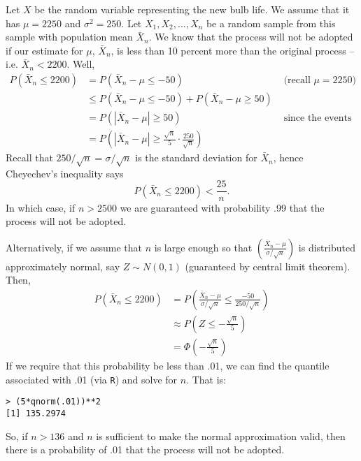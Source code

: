 \documentclass{stat_homework}
\begin{document}
\begin{solution}
  Let $X$ be the random variable representing the new bulb life.  We assume that it has $\mu = 2250$ and $\sigma^2 = 250$. Let $X_1,X_2,...,X_n$ be a random sample from this sample with population mean $\bar X_n$.  We know that the process will not be adopted if our estimate for $\mu$, $\bar X_n$, is less than 10 percent more than the original process --  i.e. $\bar X_n < 2200$. Well,
  \begin{align*}
  P(\bar X_n \le 2200) 
  &= P(\bar X_n - \mu \le -50)& \text{ (recall $\mu = 2250$)}\\
  &\le P(\bar X_n - \mu \le -50) + P(\bar X_n -\mu \ge 50) \\
  &= P(|\bar X_n -\mu| \ge 50)& \text{ since the events are disjoint,}\\
  &= P\left(|\bar X_n -\mu| \ge \frac{\sqrt n}{5} \cdot \frac{250}{\sqrt n}\right)
  \end{align*}
  Recall that $250/\sqrt n = \sigma /\sqrt n$ is the standard deviation for $\bar X_n$, hence Cheyechev's inequality says
  $$
  P(\bar X_n \le 2200) < \frac{25}n.
  $$
  In which case, if $n > 2500$ we are guaranteed with probability .99 that the process will not be adopted.

  Alternatively, if we assume that $n$ is large enough so that $\left(\frac{\bar X_n - \mu}{\sigma/\sqrt n}\right)$ is distributed approximately normal, say $Z\sim N(0,1)$ (guaranteed by central limit theorem). Then,
  \begin{align*}
  P(\bar X_n \le 2200) 
  &= P\left( \frac{\bar X_n- \mu}{\sigma/\sqrt n} \le \frac{-50}{250/\sqrt n}\right) \\
  &\approx P\left( Z \le -\frac{\sqrt n}{5}\right)\\
  &= \Phi\left(-\frac{\sqrt n}{5}\right)
  \end{align*}
  If we require that this probability be less than .01, we can find the quantile associated with .01 (via \texttt{R}) and solve for $n$.  That is: 
  \begin{verbatim}
> (5*qnorm(.01))**2 
[1] 135.2974
  \end{verbatim}
  So, if $n> 136$ and $n$ is sufficient to make the normal approximation valid, then there is a probability of .01 that the process will not be adopted. 
\end{solution}
\end{document}
